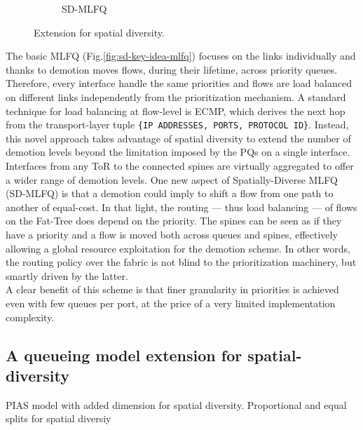 \begin{figure}
\begin{subfigure}[htpb]{0.3\textwidth}
		\caption{SD-MLFQ}
		\label{fig:sd-key-idea-sdmlfq}
	\end{subfigure}
	\caption{Extension for spatial diversity.} %
	\label{fig:sd-key-idea}
\end{figure}
The basic MLFQ (Fig.\ref{fig:sd-key-idea-mlfq}) focuses on the links individually and thanks to demotion moves flows, during their lifetime, across priority queues. Therefore, every interface handle the same priorities and flows are load balanced on different links independently from the prioritization mechanism. A standard technique for load balancing at flow-level is ECMP, which derives the next hop from the transport-layer tuple \texttt{\{IP ADDRESSES, PORTS, PROTOCOL ID\}}. Instead, this novel approach takes advantage of spatial diversity to extend the number of demotion levels beyond the limitation imposed by the PQs on a single interface. Interfaces from any ToR to the connected spines are virtually aggregated to offer a wider range of demotion levels. One new aspect of Spatially-Diverse MLFQ (SD-MLFQ) is that a demotion could imply to shift a flow from one path to another of equal-cost. In that light, the routing --- thus load balancing --- of flows on the Fat-Tree does depend on the priority. The spines can be seen as if they have a priority and a flow is moved both across queues and spines, effectively allowing a global resource exploitation for the demotion scheme. In other words, the routing policy over the fabric is not blind to the prioritization machinery, but smartly driven by the latter.  \\
A clear benefit of this scheme is that finer granularity in priorities is achieved even with few queues per port, at the price of a very limited implementation complexity.

\subsection{A queueing model extension for spatial-diversity}
\label{sec:complete-model}
PIAS model with added dimension for spatial diversity.
Proportional and equal splits for spatial diversiy
